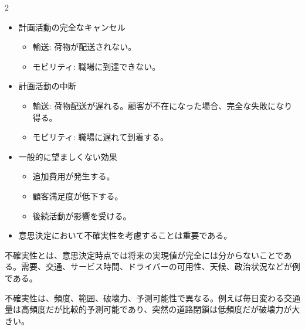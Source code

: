 \clearpage
{}
\begin{multicols}{2}\footnotesize\raggedcolumns
{}
\begin{itemize}
\item 計画活動の完全なキャンセル
\begin{itemize}
\item 輸送: 荷物が配送されない。
\item モビリティ: 職場に到達できない。
\end{itemize}
\item 計画活動の中断
\begin{itemize}
\item 輸送: 荷物配送が遅れる。顧客が不在になった場合、完全な失敗になり得る。
\item モビリティ: 職場に遅れて到着する。
\end{itemize}
\item 一般的に望ましくない効果
\begin{itemize}
\item 追加費用が発生する。
\item 顧客満足度が低下する。
\item 後続活動が影響を受ける。
\end{itemize}
\item 意思決定において不確実性を考慮することは重要である。
\end{itemize}
不確実性とは、意思決定時点では将来の実現値が完全には分からないことである。需要、交通、サービス時間、ドライバーの可用性、天候、政治状況などが例である。\par

不確実性は、頻度、範囲、破壊力、予測可能性で異なる。例えば毎日変わる交通量は高頻度だが比較的予測可能であり、突然の道路閉鎖は低頻度だが破壊力が大きい。\par


\end{multicols}
